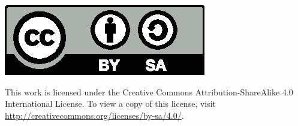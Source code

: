 \begin{center}
\includegraphics{figures/cc-by-sa.eps}
\end{center}
\begin{small}
This work is licensed under the Creative Commons Attribution-ShareAlike 4.0 International License. To view a copy of this license, visit \url{http://creativecommons.org/licenses/by-sa/4.0/}.
\end{small}
